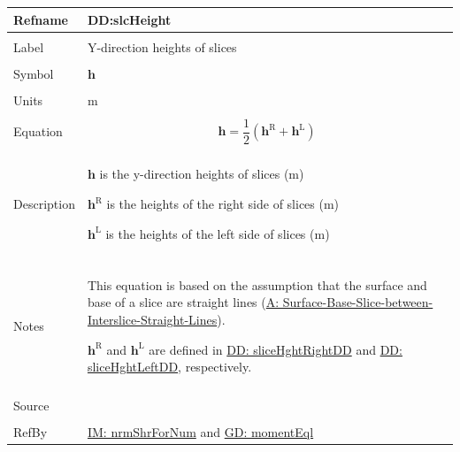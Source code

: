 \documentclass[12pt]{article}
\begin{document}
\vspace{\baselineskip}
\noindent
\begin{minipage}{\textwidth}
\begin{tabular}{>{\raggedright}p{}>{\raggedright\arraybackslash}p{}}
\toprule \textbf{Refname} & \textbf{DD:slcHeight}
\label{DD:slcHeight}
\\ \midrule \\
Label & Y-direction heights of slices
        
\\ \midrule \\
Symbol & $\mathbf{h}$
         
\\ \midrule \\
Units & m
        
\\ \midrule \\
Equation & \begin{displaymath}
           \mathbf{h}=\frac{1}{2} \left({\mathbf{h}^{\text{R}}}+{\mathbf{h}^{\text{L}}}\right)
           \end{displaymath}
\\ \midrule \\
Description & \begin{symbDescription}
              \item{$\mathbf{h}$ is the y-direction heights of slices (m)}
              \item{${\mathbf{h}^{\text{R}}}$ is the heights of the right side of slices (m)}
              \item{${\mathbf{h}^{\text{L}}}$ is the heights of the left side of slices (m)}
              \end{symbDescription}
\\ \midrule \\
Notes & This equation is based on the assumption that the surface and base of a slice are straight lines (\hyperref[assumpSBSBISL]{A: Surface-Base-Slice-between-Interslice-Straight-Lines}).
        
        ${\mathbf{h}^{\text{R}}}$ and ${\mathbf{h}^{\text{L}}}$ are defined in \hyperref[DD:sliceHghtRightDD]{DD: sliceHghtRightDD} and \hyperref[DD:sliceHghtLeftDD]{DD: sliceHghtLeftDD}, respectively.
        
\\ \midrule \\
Source & \cite{fredlund1977}
         
\\ \midrule \\
RefBy & \hyperref[IM:nrmShrForNum]{IM: nrmShrForNum} and \hyperref[GD:momentEql]{GD: momentEql}
        
\\ \bottomrule
\end{tabular}
\end{minipage}
\end{document}

